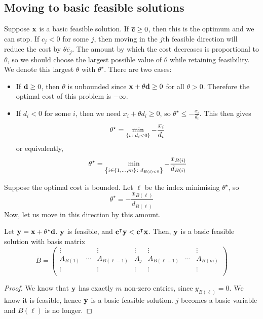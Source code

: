 \subsection{Moving to basic feasible solutions}
Suppose \( \vb x \) is a basic feasible solution.
If \( \overline{\vb c} \geq 0 \), then this is the optimum and we can stop.
If \( c_j < 0 \) for some \( j \), then moving in the \( j \)th feasible direction will reduce the cost by \( \theta \overline{c_j} \).
The amount by which the cost decreases is proportional to \( \theta \), so we should choose the largest possible value of \( \theta \) while retaining feasibility.
We denote this largest \( \theta \) with \( \theta^\star \).
There are two cases:
\begin{itemize}
	\item If \( \vb d \geq 0 \), then \( \theta \) is unbounded since \( \vb x + \theta \vb d \geq 0 \) for all \( \theta > 0 \).
	      Therefore the optimal cost of this problem is \( -\infty \).
	\item If \( d_i < 0 \) for some \( i \), then we need \( x_i + \theta d_i \geq 0 \), so \( \theta^\star \leq -\frac{x_i}{d_i} \).
	      This then gives
	      \[
		      \theta^\star = \min_{\qty{i \colon d_i < 0}} -\frac{x_i}{d_i}
	      \]
	      or equivalently,
	      \[
		      \theta^\star = \min_{\qty{i \in \qty{1,\dots,m} \colon d_{B(i) < 0}}} -\frac{x_{B(i)}}{d_{B(i)}}
	      \]
\end{itemize}
Suppose the optimal cost is bounded.
Let \( \ell \) be the index minimising \( \theta^\star \), so
\[
	\theta^\star = -\frac{x_{B(\ell)}}{d_{B(\ell)}}
\]
Now, let us move in this direction by this amount.
\begin{theorem}
	Let \( \vb y = \vb x + \theta^\star \vb d \).
	\( \vb y \) is feasible, and \( \vb c^\intercal \vb y < \vb c^\intercal \vb x \).
	Then, \( \vb y \) is a basic feasible solution with basis matrix
	\[
		\overline{B} = \begin{pmatrix}
			\vdots   &        & \vdots        & \vdots & \vdots        &        & \vdots   \\
			A_{B(1)} & \cdots & A_{B(\ell-1)} & A_{j}  & A_{B(\ell+1)} & \cdots & A_{B(m)} \\
			\vdots   &        & \vdots        & \vdots & \vdots        &        & \vdots   \\
		\end{pmatrix}
	\]
\end{theorem}
\begin{proof}
	We know that \( \vb y \) has exactly \( m \) non-zero entries, since \( y_{B(\ell)} = 0 \).
	We know it is feasible, hence \( \vb y \) is a basic feasible solution.
	\( j \) becomes a basic variable and \( B(\ell) \) is no longer.
\end{proof}

